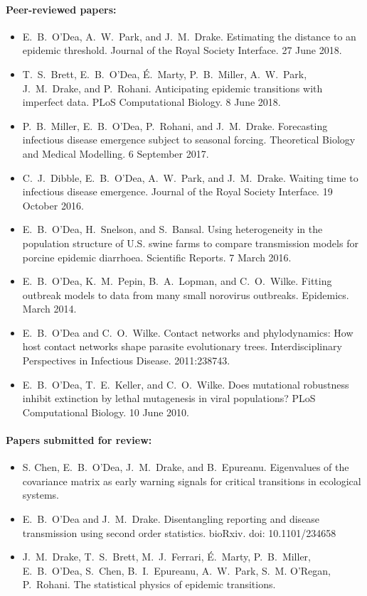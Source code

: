 \documentclass[a4paper]{article}
\begin{document}
\paragraph{Peer-reviewed papers:}
\begin{itemize}
  \item[~] E.\ B.\ O'Dea, A.\ W.\ Park, and J.\ M.\ Drake.  Estimating
    the distance to an epidemic threshold. Journal of the Royal
    Society Interface. 27 June 2018.
  \item[~] T.\ S.\ Brett, E.\ B.\ O'Dea, \'{E}.\ Marty,
    P.\ B.\ Miller, A.\ W.\ Park, J.\ M.\ Drake, and
    P.\ Rohani. Anticipating epidemic transitions with imperfect
    data. PLoS Computational Biology. 8 June 2018.
  \item[~] P.\ B.\ Miller, E.\ B.\ O'Dea, P.\ Rohani, and
    J.\ M.\ Drake. Forecasting infectious disease emergence subject to
    seasonal forcing. Theoretical Biology and Medical Modelling. 6
    September 2017.
  \item[~] C.\ J.\ Dibble, E.\ B.\ O'Dea, A.\ W.\ Park, and
    J.\ M.\ Drake. Waiting time to infectious disease
    emergence. Journal of the Royal Society Interface. 19 October 2016.
  \item[~] E.\ B.\ O'Dea, H.\ Snelson, and S.\ Bansal. Using
    heterogeneity in the population structure of U.S. swine farms to
    compare transmission models for porcine epidemic
    diarrhoea. Scientific Reports. 7 March 2016.
  \item[~] E.\ B.\ O'Dea, K.\ M.\ Pepin, B.\ A.\ Lopman, and
    C.\ O.\ Wilke. Fitting outbreak models to data from many small
    norovirus outbreaks. Epidemics. March 2014.
  \item[~] E.\ B.\ O'Dea and C.\ O.\ Wilke. Contact networks and
    phylodynamics: How host contact networks shape parasite
    evolutionary trees. Interdisciplinary Perspectives in Infectious
    Disease. 2011:238743.
  \item[~] E.\ B.\ O'Dea, T.\ E.\ Keller, and C.\ O.\ Wilke. Does
    mutational robustness inhibit extinction by lethal mutagenesis in
    viral populations? PLoS Computational Biology. 10 June 2010.
\end{itemize}

\paragraph{Papers submitted for review:}
\begin{itemize}
  \item[~] S. Chen, E.\ B.\ O'Dea, J.\ M.\ Drake, and
    B.\ Epureanu. Eigenvalues of the covariance matrix as early
    warning signals for critical transitions in ecological systems.
  \item[~] E.\ B.\ O'Dea and J.\ M.\ Drake.  Disentangling reporting and disease transmission using second order statistics. bioRxiv. doi: 10.1101/234658
  \item[~] J.\ M.\ Drake, T.\ S.\ Brett, M.\ J.\ Ferrari,
    \'{E}.\ Marty, P.\ B.\ Miller, E.\ B.\ O'Dea, S.\ Chen,
    B.\ I.\ Epureanu, A.\ W.\ Park, S.\ M. O'Regan, P.\ Rohani. The
    statistical physics of epidemic transitions.
\end{itemize}
\end{document}
